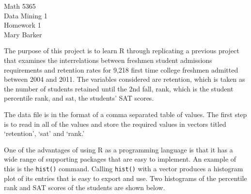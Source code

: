 \documentclass{article}
\begin{document}
\doublespace
\noindent\large{Math 5365}\\
\large{Data Mining 1}\\
\large{Homework 1}\\
\large{Mary Barker}\\
\newline

The purpose of this project is to learn R through replicating a previous project
 that examines the interrelations between freshmen 
student admissions requirements and retention rates for 9,218 first time 
college freshmen admitted between 2004 and 2011. The variables considered are 
retention, which is taken as the number of students retained until the 2nd fall, 
rank, which is the student percentile rank, and 
sat, the students' SAT scores.

The data file is in the format of a comma separated table of values. 
The first step is to read in all of the values and store the required values in 
vectors titled 	`retention', `sat' and `rank.'

One of the advantages of using R as a programming language is that it has a wide range of 
supporting packages that are easy to implement. 
An example of this is the \verb|hist()| command. Calling \verb|hist()| with a vector produces a 
histogram plot of its entries that is easy to export and use. 
Two histograms of the percentile rank and SAT scores of the students are shown below. 
\end{document}

